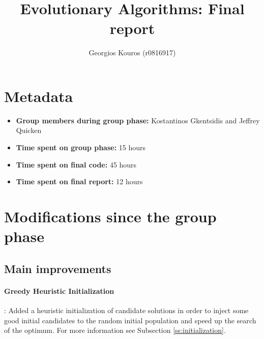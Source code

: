 \documentclass[a4paper,10pt]{article}
\title{Evolutionary Algorithms: Final report}
\author{Georgios Kouros (r0816917)}
\newcommand{\ReplaceMe}[1]{{\color{blue}#1}}
\newcommand{\RemoveMe}[1]{{\color{purple}#1}}
\begin{document}
\selectfont{}

\maketitle

\section{Metadata}

\begin{itemize}
 \item \textbf{Group members during group phase:} Kostantinos Gkentsidis and Jeffrey Quicken
 \item \textbf{Time spent on group phase:} 15 hours
 \item \textbf{Time spent on final code:} 45 hours
 \item \textbf{Time spent on final report:} 12 hours
\end{itemize}

\section{Modifications since the group phase}


\subsection{Main improvements}



\paragraph{Greedy Heuristic Initialization}: Added a heuristic initialization of candidate solutions in order to inject some good initial candidates to the random initial population and speed up the search of the optimum. For more information see Subsection \ref{ss:initialization}.
\end{document}
